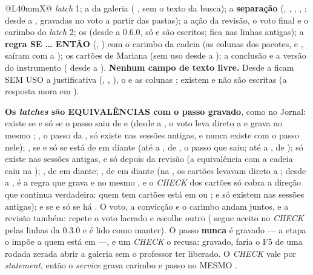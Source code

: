 \begin{tabularx}{\linewidth}{@{}L{40mm}X@{}}
  \emph{latch} 1; a  da galeria (
  , sem o texto da busca); a \textbf{separação}
  (, ,
  , , ; desde a
  , gravadas no voto a partir das pastas); a ação
  da revisão, o voto final e o carimbo do \emph{latch} 2; os 
  (desde a 0.6.0, só  e  são
  escritos;  fica nas linhas antigas); a \textbf{regra
  SE \ldots{} ENTÃO} (, ) com o carimbo da
  cadeia (as colunas dos pacotes,  e
  , saíram com a ); os cartões de Mariana (sem uso desde a ); a conclusão e a
  versão do instrumento ( desde a ). \textbf{Nenhum campo de texto livre.} Desde a
   ficam SEM USO a justificativa (,
  , ), o  e as
  colunas ;  existem e não são escritas
  (a resposta mora em ).\\
\bottomrule
\end{tabularx}

\begin{regra}
\textbf{Os \emph{latches} são EQUIVALÊNCIAS com o passo gravado}, como no
Jornal:  existe se e só se o passo saiu de  e
 (desde a , o voto leva direto a  e grava
 no mesmo ; , o passo da
, só existe nas sessões antigas, e  nunca
existe com o passo nele);
, se e só se está de  em diante
(até a , de , o passo que saiu; até a
, de );  só existe
nas sessões antigas, e só depois da revisão (a equivalência com a cadeia caiu
na ); , de  em diante; , de
 em diante (na , os cartões levavam direto a
; desde a , é a regra que grava  e
 no mesmo , e o \emph{CHECK} dos cartões só cobra
a direção que continua verdadeira: quem tem cartões está em  ou
;  e  só existem nas sessões antigas); e  se e só se há . O voto,
a convicção e o carimbo andam juntos, e a revisão também: 
repete o voto lacrado e  escolhe outro ( segue
aceito no \emph{CHECK} pelas linhas da 0.3.0 e é lido como manter). O passo
 \textbf{nunca} é gravado --- a etapa o impõe a quem está em
 ---, e um \emph{CHECK} o recusa: gravado, faria o F5 de uma rodada zerada abrir a galeria sem o
professor ter liberado. O \emph{CHECK} vale por \emph{statement}, então o
\emph{service} grava carimbo e passo no MESMO .
\end{regra}

